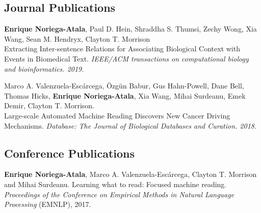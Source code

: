 \documentclass[letterpaper]{article}
\renewenvironment{itemize}{
  \begin{list}{}{
    \setlength{\leftmargin}{1.5em}
  }
}{
  \end{list}
}
\begin{document}
\subsection*{Journal Publications}
\begin{itemize}
	\item \textbf{Enrique Noriega-Atala}, Paul D. Hein, Shraddha S. Thumsi, Zechy Wong, Xia Wang, Sean M. Hendryx, Clayton T. Morrison\\ Extracting Inter-sentence Relations for Associating Biological Context with Events in Biomedical Text. \textit{IEEE/ACM transactions on computational biology and bioinformatics. 2019.}
	\item Marco A. Valenzuela-Esc\'{a}rcega, \"{O}zg\"{u}n Babur, Gus Hahn-Powell, Dane Bell, Thomas Hicks, \textbf{Enrique Noriega-Atala}, Xia Wang, Mihai Surdeanu, Emek Demir, Clayton T. Morrison. \\ Large-scale Automated Machine Reading Discovers New Cancer Driving Mechanisms. \textit{Database: The Journal of Biological Databases and Curation. 2018.} 
\end{itemize}

\subsection*{Conference Publications}
\begin{itemize}
\item \textbf{Enrique Noriega-Atala}, Marco A. Valenzuela-Esc\'{a}rcega, Clayton T. Morrison and Mihai Surdeanu. Learning what to read: Focused machine reading. \textit{Proceedings of the Conference on Empirical Methods in Natural Language Processing} (EMNLP), 2017.
\end{itemize}
\end{document}
